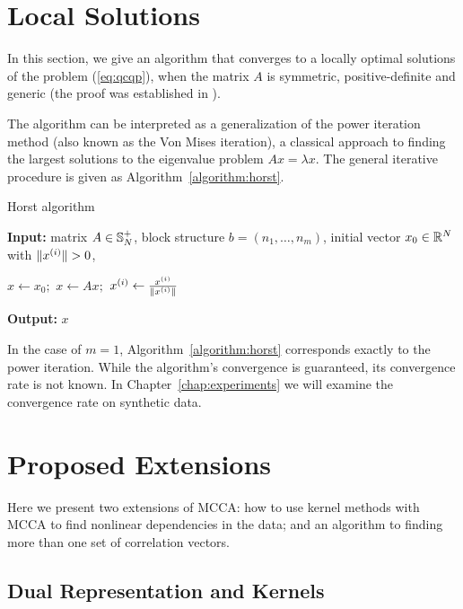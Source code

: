\section{Local Solutions}\label{chap:extensions:horst}
In this section, we give an algorithm that converges to a locally optimal
solutions of the problem (\ref{eq:qcqp}), when the matrix $A$ is symmetric,
positive-definite and generic (the proof was established in \cite{Chu}).

The algorithm can be interpreted as a generalization of the power
iteration method (also known as the Von Mises iteration), a classical
approach to finding the largest solutions to the eigenvalue problem
$A x = \lambda x$.  The general iterative procedure is given
as Algorithm~\ref{algorithm:horst}.
\begin{algorithm}
\caption{Horst algorithm}
\label{algorithm:horst}
{\bf Input:} matrix $A \in \mathbb{S}_N^+$, block structure $b = \left(n_1,\ldots,n_m\right)$,
initial vector $x_0 \in \mathbb{R}^N$ with $\lVert x^{(i)}\rVert > 0$,  \par
\begin{algorithmic}
\STATE $x \leftarrow x_0;$
\STATE $x \leftarrow A x;$
\STATE $x^{(i)} \leftarrow \frac{x^{(i)}}{\lVert x^{(i)}\rVert}$
\ENDFOR
\ENDFOR
\end{algorithmic}
{\bf Output:} $x$
\end{algorithm}

In the case of $m=1$, Algorithm~\ref{algorithm:horst}
corresponds exactly to the power iteration. While the algorithm's
convergence is guaranteed, its convergence rate is not known. In
Chapter~\ref{chap:experiments} we will examine the convergence
rate on synthetic data.

\section{Proposed Extensions}

Here we present two extensions of MCCA: how to use kernel methods with
MCCA to find nonlinear dependencies in the data; and an
algorithm to finding more than one set of correlation vectors.
\subsection{Dual Representation and Kernels}\label{chap:extensions:kernels}

